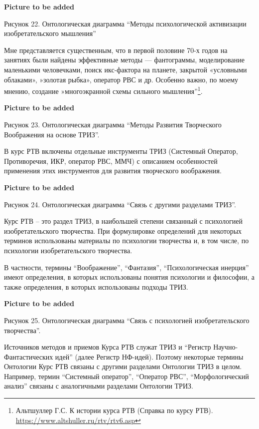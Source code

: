 \documentclass[11pt,a4paper]{article}
\newcommand{\addpicture}{\textbf{Picture to be added}\par}
\begin{document}
\begin{center}
  \addpicture
  Рисунок 22. Онтологическая диаграмма “Методы психологической активизации
  изобретательского мышления”
\end{center}
Мне представляется существенным, что в первой половине 70-х годов на занятиях
были найдены эффективные методы — фантограммы, моделирование маленькими
человечками, поиск икс-фактора на планете, закрытой «условными облаками»,
»золотая рыбка», оператор РВС и др. Особенно важно, по моему мнению, создание
»многоэкранной схемы сильного мышления”\footnote{Альтшуллер Г.С. К истории
  курса РТВ (Справка по курсу РТВ).
  \url{https://www.altshuller.ru/rtv/rtv6.asp}}.
\begin{center}
  \addpicture
  Рисунок 23. Онтологическая диаграмма “Методы Развития Творческого
  Воображения на основе ТРИЗ”.
\end{center}
В курс РТВ включены отдельные инструменты ТРИЗ (Системный Оператор,
Противоречия, ИКР, оператор РВС, ММЧ) с описанием особенностей применения этих
инструментов для развития творческого воображения.
\begin{center}
  \addpicture
  Рисунок 24. Онтологическая диаграмма “Связь с другими разделами ТРИЗ”.
\end{center}
Курс РТВ -- это раздел ТРИЗ, в наибольшей степени связанный с психологией
изобретательского творчества. При формулировке определений для некоторых
терминов использованы материалы по психологии творчества и, в том числе, по
психологии изобретательского творчества.

В частности, термины “Воображение”, “Фантазия”, “Психологическая инерция”
имеют определения, в которых использованы понятия психологии и философии, а
также определения, в которых использованы подходы ТРИЗ.

\begin{center}
  \addpicture
  Рисунок 25. Онтологическая диаграмма “Связь с психологией изобретательского
  творчества”.
\end{center}
Источников методов и приемов Курса РТВ служат ТРИЗ и “Регистр
Научно-Фантастических идей” (далее Регистр НФ-идей). Поэтому некоторые термины
Онтологии Курс РТВ связаны с другими разделами Онтологии ТРИЗ в целом.
Например, термин “Системный оператор”, “Оператор РВС”, “Морфологический
анализ” связаны с аналогичными разделами Онтологии ТРИЗ.
\end{document}
